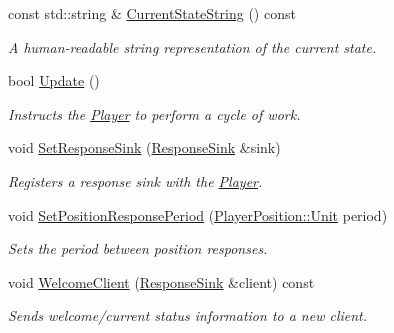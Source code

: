 \begin{DoxyCompactItemize}
const std\+::string \& \hyperlink{classPlayer_a361edb67ec9c9db40cf25463f2929b42}{Current\+State\+String} () const 
\begin{DoxyCompactList}\small\item\em A human-\/readable string representation of the current state. \end{DoxyCompactList}\item 
bool \hyperlink{classPlayer_a91f887a024035be5030aa4b3384705fa}{Update} ()
\begin{DoxyCompactList}\small\item\em Instructs the \hyperlink{classPlayer}{Player} to perform a cycle of work. \end{DoxyCompactList}\item 
void \hyperlink{classPlayer_a719de5af4d1534c2d805a19d5d995deb}{Set\+Response\+Sink} (\hyperlink{classResponseSink}{Response\+Sink} \&sink)
\begin{DoxyCompactList}\small\item\em Registers a response sink with the \hyperlink{classPlayer}{Player}. \end{DoxyCompactList}\item 
void \hyperlink{classPlayer_a1e65e04dae199230d80639112ac07288}{Set\+Position\+Response\+Period} (\hyperlink{classPlayerPosition_a535c99057ceca21d8fbe82883c592a66}{Player\+Position\+::\+Unit} period)
\begin{DoxyCompactList}\small\item\em Sets the period between position responses. \end{DoxyCompactList}\item 
void \hyperlink{classPlayer_aac35c9a49758150d5c5e0ea2fcd94d16}{Welcome\+Client} (\hyperlink{classResponseSink}{Response\+Sink} \&client) const 
\begin{DoxyCompactList}\small\item\em Sends welcome/current status information to a new client. \end{DoxyCompactList}\end{DoxyCompactItemize}
